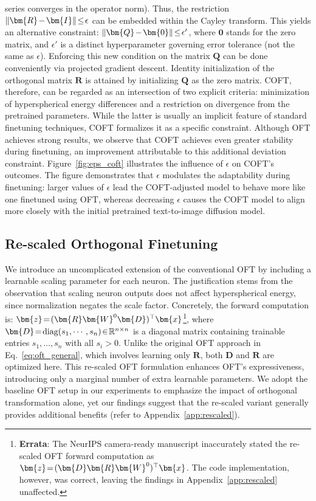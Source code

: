 series converges in the operator norm). Thus, the restriction $\thickmuskip=2mu \medmuskip=2mu\|\bm{R}-\bm{I}\|\leq\epsilon$ can be embedded within the Cayley transform. This yields an alternative constraint: $\thickmuskip=2mu \medmuskip=2mu \|\bm{Q}-\bm{0}\|\leq\epsilon'$, where $\bm{0}$ stands for the zero matrix, and $\epsilon'$ is a distinct hyperparameter governing error tolerance (not the same as $\epsilon$). Enforcing this new condition on the matrix $\bm{Q}$ can be done conveniently via projected gradient descent. Identity initialization of the orthogonal matrix $\bm{R}$ is attained by initializing $\bm{Q}$ as the zero matrix. COFT, therefore, can be regarded as an intersection of two explicit criteria: minimization of hyperspherical energy differences and a restriction on divergence from the pretrained parameters. While the latter is usually an implicit feature of standard finetuning techniques, COFT formalizes it as a specific constraint. Although OFT achieves strong results, we observe that COFT achieves even greater stability during finetuning, an improvement attributable to this additional deviation constraint. Figure~\ref{fig:eps_coft} illustrates the influence of $\epsilon$ on COFT's outcomes. The figure demonstrates that $\epsilon$ modulates the adaptability during finetuning: larger values of $\epsilon$ lead the COFT-adjusted model to behave more like one finetuned using OFT, whereas decreasing $\epsilon$ causes the COFT model to align more closely with the initial pretrained text-to-image diffusion model.

\subsection{Re-scaled Orthogonal Finetuning}

We introduce an uncomplicated extension of the conventional OFT by including a learnable scaling parameter for each neuron. The justification stems from the observation that scaling neuron outputs does not affect hyperspherical energy, since normalization negates the scale factor. Concretely, the forward computation is: $\thickmuskip=2mu \medmuskip=2mu\bm{z}=(\bm{R}\bm{W}^0\bm{D})^\top\bm{x}$\footnote{\textbf{Errata}: The NeurIPS camera-ready manuscript inaccurately stated the re-scaled OFT forward computation as $\thickmuskip=2mu \medmuskip=2mu\bm{z}=(\bm{D}\bm{R}\bm{W}^0)^\top\bm{x}$. The code implementation, however, was correct, leaving the findings in Appendix~\ref{app:rescaled} unaffected.}, where $\thickmuskip=2mu \medmuskip=2mu \bm{D}=\text{diag}(s_1,\cdots,s_n)\in\mathbb{R}^{n\times n}$ is a diagonal matrix containing trainable entries $s_1,\ldots,s_n$ with all $s_i>0$. Unlike the original OFT approach in Eq.~\eqref{eq:oft_general}, which involves learning only $\bm{R}$, both $\bm{D}$ and $\bm{R}$ are optimized here. This re-scaled OFT formulation enhances OFT’s expressiveness, introducing only a marginal number of extra learnable parameters. We adopt the baseline OFT setup in our experiments to emphasize the impact of orthogonal transformation alone, yet our findings suggest that the re-scaled variant generally provides additional benefits (refer to Appendix~\ref{app:rescaled}).


